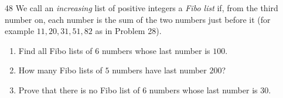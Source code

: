 \begin{probbox}{48}{}
We call an \emph{increasing} list of positive integers a \emph{Fibo list} if, from the third number on, each number is the sum of the two numbers just before it (for example $11, 20, 31, 51, 82$ as in Problem 28).
\begin{enumerate}[label=\alph*),leftmargin=1.6em,itemsep=1pt]
\item Find all Fibo lists of $6$ numbers whose last number is $100$.
\item How many Fibo lists of $5$ numbers have last number $200$?
\item Prove that there is no Fibo list of $6$ numbers whose last number is $30$.
\end{enumerate}
\end{probbox}

